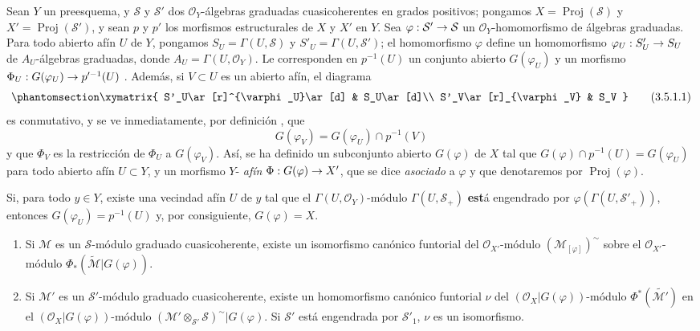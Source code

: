 \documentclass[oneside,10pt]{amsart}
\makeatletter
\newcommand{\ega@arrow}[2]{\mathchoice{#1}{#2}{#2}{#2}}
\renewcommand{\to}{\ega@arrow{\longrightarrow}{\rightarrow}}
\newcommand{\oldpage}[2][]{\marginnote{\normalfont\footnotesize\textbf{#1}~|~#2}\ignorespaces}
\let\EGAOriginalLabel\label
\renewcommand{\label}[1]{\phantomsection\EGAOriginalLabel{#1}}
\makeatother
\begin{document}
\begin{env}[3.5.1]
\label{II.3.5.1-fr}
Sean $Y$ un preesquema, y $\mathcal{S}$ y $\mathcal{S}'$ dos $\mathcal{O}_Y$-álgebras graduadas cuasicoherentes en grados positivos; pongamos $X=\operatorname{Proj}(\mathcal{S})$ y $X'=\operatorname{Proj}(\mathcal{S}')$, y sean $p$ y $p'$ los morfismos estructurales de $X$ y $X'$ en $Y$.
Sea $\varphi:\mathcal{S}'\to\mathcal{S}$ un $\mathcal{O}_Y$-homomorfismo de álgebras graduadas.
Para todo abierto afín $U$ de $Y$, pongamos $S_U=\Gamma(U,\mathcal{S})$ y $S'_U=\Gamma(U,\mathcal{S}')$; el homomorfismo $\varphi$ define un homomorfismo $\varphi_U:S'_U\to S_U$ de $A_U$-álgebras graduadas, donde $A_U=\Gamma(U,\mathcal{O}_Y)$.
Le corresponden en $p^{-1}(U)$ un conjunto abierto $G(\varphi_U)$ y un morfismo $\Phi_U:G(\varphi_U)\to p'^{-1}(U)$ .
Además, si $V\subset U$ es un abierto afín, el diagrama
\[
\label{II.3.5.1.1-fr}
  \xymatrix{
    S'_U\ar[r]^{\varphi_U}\ar[d]
    & S_U\ar[d]\\
    S'_V\ar[r]_{\varphi_V}
    & S_V
  }
\tag{3.5.1.1}
\]
es conmutativo, y se ve inmediatamente, por definición , que
\[
  G(\varphi_V)=G(\varphi_U)\cap p^{-1}(V)
\]
y que $\Phi_V$ es la restricción de $\Phi_U$ a $G(\varphi_V)$.
Así, se ha definido un subconjunto abierto $G(\varphi)$ de $X$ tal que $G(\varphi)\cap p^{-1}(U)=G(\varphi_U)$ para todo abierto afín $U\subset Y$, y un morfismo $Y$-
\oldpage[II]{62}
\emph{afín} $\Phi:G(\varphi)\to X'$, que se dice \emph{asociado} a $\varphi$ y que denotaremos por $\operatorname{Proj}(\varphi)$.

Si, para todo $y\in Y$, existe una vecindad afín $U$ de $y$ tal que el $\Gamma(U,\mathcal{O}_Y)$-módulo $\Gamma(U,\mathcal{S}_+)$ \textbf{est}á engendrado por $\varphi(\Gamma(U,\mathcal{S}'_+))$, entonces $G(\varphi_U)=p^{-1}(U)$ y, por consiguiente, $G(\varphi)=X$.
\end{env}

\begin{proposition}[3.5.2]
\label{II.3.5.2-fr}
\medskip\noindent
\begin{enumerate}
  \item[(i)] Si $\mathcal{M}$ es un $\mathcal{S}$-módulo graduado cuasicoherente, existe un isomorfismo canónico funtorial del $\mathcal{O}_{X'}$-módulo $(\mathcal{M}_{[\varphi]})^{\sim}$ sobre el $\mathcal{O}_{X'}$-módulo $\Phi_*(\widetilde{\mathcal{M}}|G(\varphi))$.
  \item[(ii)] Si $\mathcal{M}'$ es un $\mathcal{S}'$-módulo graduado cuasicoherente, existe un homomorfismo canónico funtorial $\nu$ del $(\mathcal{O}_X|G(\varphi))$-módulo $\Phi^*(\widetilde{\mathcal{M}'})$ en el $(\mathcal{O}_X|G(\varphi))$-módulo $(\mathcal{M}'\otimes_{\mathcal{S}'}\mathcal{S})^{\sim}|G(\varphi)$.
    Si $\mathcal{S}'$ está engendrada por $\mathcal{S}'_1$, $\nu$ es un isomorfismo.
\end{enumerate}
\end{proposition}
\end{document}
